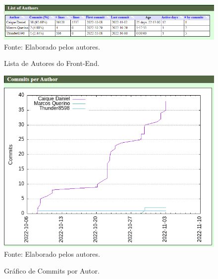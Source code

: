 \documentclass[
    12pt,               %
    openright,          %
    oneside,
    a4paper,            %
    BIBLATEX,           %
    TODO,               %
    english,            %
    brazil              %
    ]{ifsp-spo-inf-ctds}
\begin{document}
            \begin{figure}[H]
                \centering
                \caption{Lista de Autores do Front-End.}
                \includegraphics[width=1 \textwidth]{Gitstats/front-end/ListaAutores.png}
                {\footnotesize Fonte: Elaborado pelos autores.}
                \label{fig:autorFront}
            \end{figure}
            
            \begin{figure}[H]
                \centering
                \caption{Gráfico de Commits por Autor.}
                \includegraphics[width=1 \textwidth]{Gitstats/front-end/CommitsPorAutor.png}
                {\footnotesize Fonte: Elaborado pelos autores.}
                \label{fig:commitFront}
            \end{figure}
    
\end{document}
